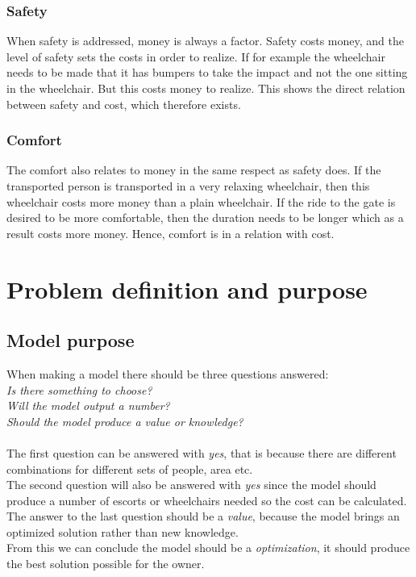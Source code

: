 \documentclass[a4paper, 11pt, notitlepage]{report}
\begin{document}
\subsection{Safety}
When safety is addressed, money is always a factor. Safety costs money, and the level of safety sets the costs in order to realize. If for example the wheelchair needs to be made that it has bumpers to take the impact and not the one sitting in the wheelchair. But this costs money to realize. This shows the direct relation between safety and cost, which therefore exists.
\subsection{Comfort}
The comfort also relates to money in the same respect as safety does. If the transported person is transported in a very relaxing wheelchair, then this wheelchair costs more money than a plain wheelchair. If the ride to the gate is desired to be more comfortable, then the duration needs to be longer which as a result costs more money. Hence, comfort is in a relation with cost.
\chapter{Problem definition and purpose}
\section{Model purpose}
When making a model there should be three questions answered:\\
\emph{Is there something to choose?\\
Will the model output a number?\\
Should the model produce a value or knowledge?}\\\\
The first question can be answered with \emph{yes}, that is because there are different combinations for different sets of people, area etc.\\
The second question will also be answered with \emph{yes} since the model should produce a number of escorts or wheelchairs needed so the cost can be calculated.\\
The answer to the last question should be a \emph{value}, because the model brings an optimized solution rather than new knowledge.\\ From this we can conclude the model should be a \emph{optimization}, it should produce the best solution possible for the owner.
\end{document}
